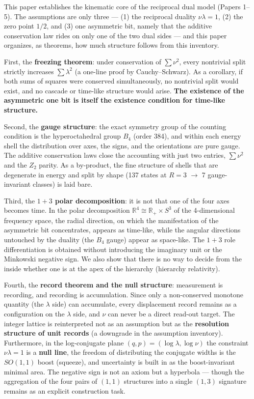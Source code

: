 \documentclass[
]{ltjsarticle}
\begin{document}
This paper establishes the kinematic core of the reciprocal dual model
(Papers 1--5). The assumptions are only three --- (1) the reciprocal
duality \(\nu\lambda=1\), (2) the zero point \(1/2\), and (3) one
asymmetric bit, namely that the additive conservation law rides on only
one of the two dual sides --- and this paper organizes, as theorems, how
much structure follows from this inventory.

First, the \textbf{freezing theorem}: under conservation of
\(\sum\nu^2\), every nontrivial split strictly increases
\(\sum\lambda^2\) (a one-line proof by Cauchy--Schwarz). As a corollary,
if both sums of squares were conserved simultaneously, no nontrivial
split would exist, and no cascade or time-like structure would arise.
\textbf{The existence of the asymmetric one bit is itself the existence
condition for time-like structure.}

Second, the \textbf{gauge structure}: the exact symmetry group of the
counting condition is the hyperoctahedral group \(B_4\) (order 384), and
within each energy shell the distribution over axes, the signs, and the
orientations are pure gauge. The additive conservation laws close the
accounting with just two entries, \(\sum\nu^2\) and the \(Z_2\) parity.
As a by-product, the fine structure of shells that are degenerate in
energy and split by shape (137 states at \(R=3\) \(\to\) 7
gauge-invariant classes) is laid bare.

Third, the \textbf{\(1{+}3\) polar decomposition}: it is not that one of
the four axes becomes time. In the polar decomposition
\(\mathbb{R}^4\cong\mathbb{R}_+\times S^3\) of the 4-dimensional
frequency space, the radial direction, on which the manifestation of the
asymmetric bit concentrates, appears as time-like, while the angular
directions untouched by the duality (the \(B_4\) gauge) appear as
space-like. The \(1{+}3\) role differentiation is obtained without
introducing the imaginary unit or the Minkowski negative sign. We also
show that there is no way to decide from the inside whether one is at
the apex of the hierarchy (hierarchy relativity).

Fourth, the \textbf{record theorem and the null structure}: measurement
is recording, and recording is accumulation. Since only a non-conserved
monotone quantity (the \(\lambda\) side) can accumulate, every
displacement record remains as a configuration on the \(\lambda\) side,
and \(\nu\) can never be a direct read-out target. The integer lattice
is reinterpreted not as an assumption but as the \textbf{resolution
structure of unit records} (a downgrade in the assumption inventory).
Furthermore, in the log-conjugate plane \((q,p)=(\log\lambda,\log\nu)\)
the constraint \(\nu\lambda=1\) is a \textbf{null line}, the freedom of
distributing the conjugate widths is the \(SO(1,1)\) boost (squeeze),
and uncertainty is built in as the boost-invariant minimal area. The
negative sign is not an axiom but a hyperbola --- though the aggregation
of the four pairs of \((1,1)\) structures into a single \((1,3)\)
signature remains as an explicit construction task.
\end{document}

